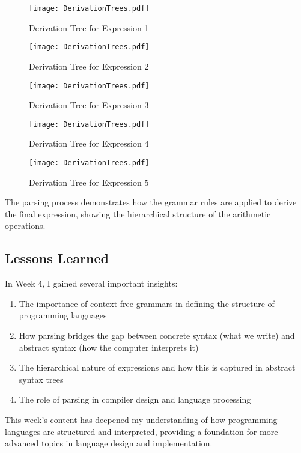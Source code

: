 \documentclass{article}
\begin{document}
\begin{figure}[h]
\centering
\texttt{[image: DerivationTrees.pdf]}
\caption{Derivation Tree for Expression 1}
\end{figure}

\begin{figure}[h]
\centering
\texttt{[image: DerivationTrees.pdf]}
\caption{Derivation Tree for Expression 2}
\end{figure}

\begin{figure}[h]
\centering
\texttt{[image: DerivationTrees.pdf]}
\caption{Derivation Tree for Expression 3}
\end{figure}

\begin{figure}[h]
\centering
\texttt{[image: DerivationTrees.pdf]}
\caption{Derivation Tree for Expression 4}
\end{figure}

\begin{figure}[h]
\centering
\texttt{[image: DerivationTrees.pdf]}
\caption{Derivation Tree for Expression 5}
\end{figure}

The parsing process demonstrates how the grammar rules are applied to derive the final expression, showing the hierarchical structure of the arithmetic operations.

\subsection*{Lessons Learned}

In Week 4, I gained several important insights:

\begin{enumerate}
    \item The importance of context-free grammars in defining the structure of programming languages
    \item How parsing bridges the gap between concrete syntax (what we write) and abstract syntax (how the computer interprets it)
    \item The hierarchical nature of expressions and how this is captured in abstract syntax trees
    \item The role of parsing in compiler design and language processing
\end{enumerate}

This week's content has deepened my understanding of how programming languages are structured and interpreted, providing a foundation for more advanced topics in language design and implementation.
\end{document}
